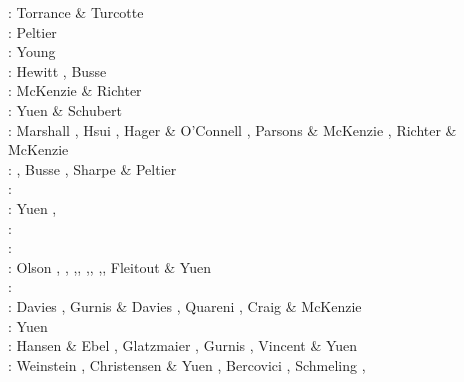 \begin{scriptsize}
\nineteenseventyone: Torrance \& Turcotte \cite{totu71}\\
\nineteenseventytwo: Peltier \cite{pelt72}\\
\nineteenseventyfour: Young \cite{youn74}\\
\nineteenseventyfive: Hewitt \etal \cite{hemw75}, Busse \cite{buss75}\\
\nineteenseventysix: McKenzie \& Richter \cite{mcri76}\\
\nineteenseventyseven: Yuen \& Schubert \cite{yusc77} \\
\nineteenseventyeight: Marshall \etal \cite{mahz78}, Hsui \cite{hsui78}, Hager \& O'Connell \cite{haoc78},
                       Parsons \& McKenzie \cite{pamc78}, Richter \& McKenzie \cite{rimc78}\\
\nineteenseventynine: \cite{ludt79}, Busse \cite{buss79}, Sharpe \& Peltier \cite{shpe79}\\
\nineteeneighty: \cite{olco80}\cite{jamc80}\cite{scsc80}\cite{zess80}\\
\nineteeneightyone: Yuen \etal \cite{yups81}, \cite{buss81}\cite{jasc81}\cite{haoc81}\cite{cotu81}\\
\nineteeneightytwo: \cite{jape82}\cite{homc82}\cite{buri82}\\
\nineteeneightythree: \cite{hous83}\cite{hous83b}
                      \cite{chri83}\cite{mcke83}
                      \cite{chri83b}\cite{zesd83}\\
\nineteeneightyfour: Olson \etal \cite{olyb84}, \cite{jarv84},
                     \cite{haeb84},\cite{harp84},
                     \cite{davi84},\cite{boas84},
                     \cite{chri84},\cite{moca84},
                     Fleitout \& Yuen \cite{flyu84,flyu84b}\\
\nineteeneightyfive: \cite{jarv85}\cite{baum85}\cite{chri85}\cite{csra85}\cite{scan85}\\
\nineteeneightysix: Davies \cite{davi86}, Gurnis \& Davies \cite{guda86},
                    Quareni \etal \cite{quys86}, Craig \& McKenzie \cite{crmc86}\\
\nineteeneightyseven: Yuen \etal{}\cite{yuqh87}\\
\nineteeneightyeight: Hansen \& Ebel \cite{haeb88}, Glatzmaier \cite{glat88}, 
                      Gurnis \cite{gurn88}, Vincent \& Yuen \cite{viyu88} \\ 
\nineteeneightynine: Weinstein \etal \cite{weoy89}, Christensen \& Yuen \cite{chyu89},
                     Bercovici \etal \cite{besg89}, Schmeling \cite{schm89},

\end{scriptsize}
